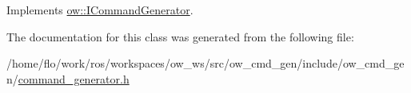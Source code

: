 Implements \hyperlink{classow_1_1ICommandGenerator_ae7309a2b5839ee3376380693617a0cdd}{ow\+::\+I\+Command\+Generator}.



The documentation for this class was generated from the following file\+:\begin{DoxyCompactItemize}
\item 
/home/flo/work/ros/workspaces/ow\+\_\+ws/src/ow\+\_\+cmd\+\_\+gen/include/ow\+\_\+cmd\+\_\+gen/\hyperlink{command__generator_8h}{command\+\_\+generator.\+h}\end{DoxyCompactItemize}
